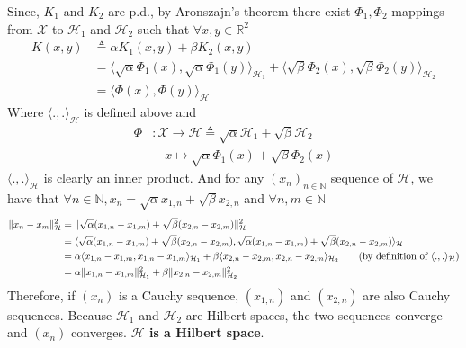 \documentclass[10pt]{article}
\begin{document}
    Since, $K_1$ and $K_2$ are p.d., by Aronszajn's theorem there exist 
    $\Phi_1, \Phi_2$ mappings from $\mathcal{X}$ to $\mathcal{H}_1$ and 
    $\mathcal{H}_2$ such that $\forall x,y \in \mathbb{R}^2$
    \begin{align*}
        K(x,y) &\triangleq \alpha K_1(x,y) + \beta K_2(x, y)\\
        &= \langle \sqrt{\alpha}\Phi_1(x),\sqrt{\alpha}\Phi_1(y) 
        \rangle_{\mathcal{H}_1} + \langle\sqrt{\beta} \Phi_2(x),
        \sqrt{\beta}\Phi_2(y) \rangle_{\mathcal{H}_2}\\
        & = \langle \Phi(x), \Phi(y) \rangle_{\mathcal{H}}
    \end{align*}
    Where $\langle.,.\rangle_{\mathcal{H}}$ is defined above and
    \begin{align*}
        \Phi & :\mathcal{X} \rightarrow \mathcal{H} \triangleq \sqrt{\alpha}
        \mathcal{H}_1 + \sqrt{\beta} \mathcal{H}_2\\
        &\quad x\mapsto \sqrt{\alpha} \Phi_1(x) + \sqrt{\beta} \Phi_2(x)
    \end{align*}
    $\langle.,.\rangle_{\mathcal{H}}$ is clearly an inner product. And for any
    $(x_n)_{n\in\mathbb{N}}$ sequence of $\mathcal{H}$, we have that 
    $\forall n \in \mathbb{N},x_n = \sqrt{\alpha} x_{1,n} + \sqrt{\beta} 
    x_{2,n}$ and $\forall n,m \in \mathbb{N}$
    \begin{align*}
        \lVert x_n - x_m \rVert^2_\mathcal{H} &= \lVert \sqrt{\alpha} (x_{1,n} - 
        x_{1,m}) + \sqrt{\beta} (x_{2,n} -  x_{2,m})\rVert^2_\mathcal{H}\\
        &= \langle \sqrt{\alpha} (x_{1,n} - 
        x_{1,m}) + \sqrt{\beta} (x_{2,n} -  x_{2,m}), \sqrt{\alpha} (x_{1,n} - 
        x_{1,m}) + \sqrt{\beta} (x_{2,n} -  x_{2,m}) \rangle_{\mathcal{H}}\\
        &= \alpha \langle x_{1,n} - x_{1,m}, x_{1,n} - x_{1,m} 
        \rangle_{\mathcal{H}_1} + \beta \langle x_{2,n} - x_{2,m}, x_{2,n} - 
        x_{2,m}  \rangle_{\mathcal{H}_2} \tag{by definition of 
        $\langle.,.\rangle_{\mathcal{H}}$}\\
        &= \alpha \lVert x_{1,n} - x_{1,m} \rVert^2_{\mathcal{H}_1} +
        \beta \lVert x_{2,n} - x_{2,m} \rVert^2_{\mathcal{H}_2}
    \end{align*}
    Therefore, if $(x_n)$ is a Cauchy sequence, $(x_{1,n})$ and  $(x_{2,n})$ 
    are also  Cauchy sequences. Because $\mathcal{H}_1$ and $\mathcal{H}_2$ 
    are Hilbert spaces, the two sequences converge and $(x_n)$ converges. 
    \textbf{$\mathcal{H}$ is a Hilbert space}.
\end{document}
